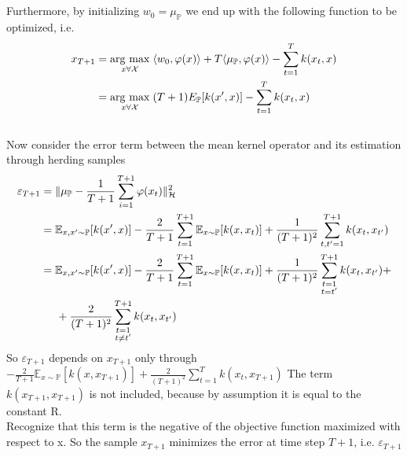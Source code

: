 \\
\\
Furthermore, by initializing $w_{0}=\mu_{\mathbb{P}}$ we end up with the following function to be optimized, i.e.
\\
\begin{align*}
x_{T+1}&=\argmax{x\forall \mathcal{X}}\langle w_{0},\phi(x)\rangle +T\langle \mu_{\mathbb{P}},\phi(x)\rangle- \sum\limits_{t=1}^{T}k(x_{t}, x)    
\\
&=\argmax{x\forall \mathcal{X}} (T+1)E_{\mathbb{P}}[k(x',x)]- \sum\limits_{t=1}^{T}k(x_{t}, x)    
\end{align*}
\\ 
Now consider the error term between the mean kernel operator and its estimation through herding samples
\\
\begin{align*}
\varepsilon_{T+1}&=\| \mu_{\mathbb{P}} -\frac{1}{T+1}\sum\limits_{i=1}^{T+1} \phi(x_{t})\|_{\mathcal{H}}^{2}
\\
&=\mathbb{E}_{x,x' \sim \mathbb{P}} [k(x',x)] - \frac{2}{T+1}\sum \limits_{t=1}^{T+1} \mathbb{E}_{x \sim \mathbb{P}} [k(x,x_{t})] +\frac{1}{(T+1)^2}\sum \limits_{t,t'=1}^{T+1} k(x_{t}, x_{t'})
\\
&=
\mathbb{E}_{x,x' \sim \mathbb{P}} [k(x',x)] - \frac{2}{T+1}\sum \limits_{t=1}^{T+1} \mathbb{E}_{x \sim \mathbb{P}} [k(x,x_{t})] +\frac{1}{(T+1)^2}\sum \limits_{\substack{
t=1\\ t=t'}}^{T+1} k(x_{t}, x_{t'})+
\\
&\hspace{0.5cm}
+\frac{2}{(T+1)^2}\sum \limits_{\substack{
t=1\\ t\neq t'}}^{T+1} k(x_{t}, x_{t'})
\\
\end{align*}
So $\varepsilon_{T+1}$ depends on $x_{T+1}$ only through $-\frac{2}{T+1} \mathbb{E}_{x \sim \mathbb{P}} [k(x,x_{T+1})]+
\frac{2}{(T+1)^2} \sum \limits_{t=1}^{T}k(x_{t},x_{T+1})
$
The term $k(x_{T+1},x_{T+1})$ is not included, because by assumption it is equal to the constant R.
\\
Recognize that this term is the negative of the objective function maximized with respect to x. So the sample $x_{T+1}$ minimizes the error at time step $T+1$, i.e. $\varepsilon_{T+1}$ 
\\
